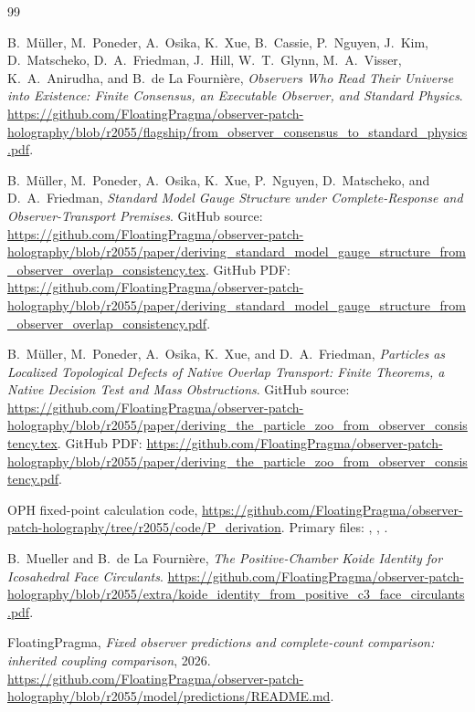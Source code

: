\documentclass[11pt]{article}
\theoremstyle{remark}
\begin{document}
\begin{thebibliography}{99}

B.\ M\"uller, M.\ Poneder, A.\ Osika, K.\ Xue, B.\ Cassie, P.\ Nguyen, J.\ Kim, D.\ Matscheko, D.\ A.\ Friedman, J.\ Hill, W.\ T.\ Glynn, M.\ A.\ Visser, K.\ A.\ Anirudha, and B.\ de La Fourni\`ere,
\emph{Observers Who Read Their Universe into Existence: Finite Consensus, an Executable Observer, and Standard Physics}.
\url{https://github.com/FloatingPragma/observer-patch-holography/blob/r2055/flagship/from_observer_consensus_to_standard_physics.pdf}.

B.\ M\"uller, M.\ Poneder, A.\ Osika, K.\ Xue, P.\ Nguyen, D.\ Matscheko, and D.\ A.\ Friedman,
\emph{Standard Model Gauge Structure under Complete-Response and Observer-Transport Premises}.
GitHub source:
\url{https://github.com/FloatingPragma/observer-patch-holography/blob/r2055/paper/deriving_standard_model_gauge_structure_from_observer_overlap_consistency.tex}.
GitHub PDF:
\url{https://github.com/FloatingPragma/observer-patch-holography/blob/r2055/paper/deriving_standard_model_gauge_structure_from_observer_overlap_consistency.pdf}.

B.\ M\"uller, M.\ Poneder, A.\ Osika, K.\ Xue, and D.\ A.\ Friedman,
\emph{Particles as Localized Topological Defects of Native Overlap Transport: Finite Theorems, a Native Decision Test and Mass Obstructions}.
GitHub source:
\url{https://github.com/FloatingPragma/observer-patch-holography/blob/r2055/paper/deriving_the_particle_zoo_from_observer_consistency.tex}.
GitHub PDF:
\url{https://github.com/FloatingPragma/observer-patch-holography/blob/r2055/paper/deriving_the_particle_zoo_from_observer_consistency.pdf}.

OPH fixed-point calculation code,
\url{https://github.com/FloatingPragma/observer-patch-holography/tree/r2055/code/P_derivation}.
Primary files:
,
,
.

B.\ Mueller and B.\ de La Fourni\`ere,
\emph{The Positive-Chamber Koide Identity for Icosahedral Face Circulants}.
\url{https://github.com/FloatingPragma/observer-patch-holography/blob/r2055/extra/koide_identity_from_positive_c3_face_circulants.pdf}.

FloatingPragma,
\emph{Fixed observer predictions and complete-count comparison: inherited coupling comparison}, 2026.
\url{https://github.com/FloatingPragma/observer-patch-holography/blob/r2055/model/predictions/README.md}.


\end{thebibliography}
\end{document}
